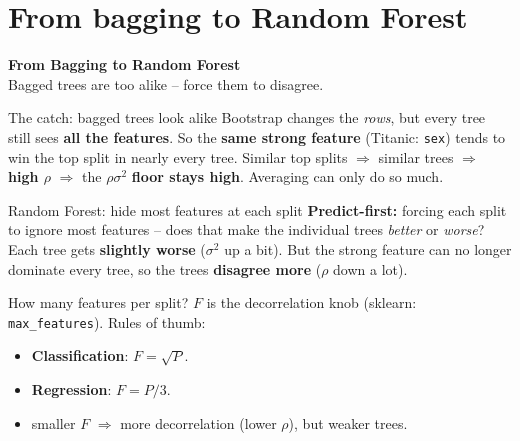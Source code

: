 \documentclass[aspectratio=169]{beamer}
\newcommand{\sectiontransition}[2]{%
  \begin{frame}[plain]
    \vfill
    \begin{center}
      {\Large\color{popblue}\textbf{#1}}\\[10pt]
      {\normalsize #2}
    \end{center}
    \vfill
  \end{frame}}
\begin{document}
\section{From bagging to Random Forest}
\sectiontransition{From Bagging to Random Forest}{Bagged trees are too alike -- force them to disagree.}

\begin{frame}{The catch: bagged trees look alike}
  Bootstrap changes the \emph{rows}, but every tree still sees \textbf{all the features}.
  So the \textbf{same strong feature} (Titanic: \texttt{sex}) tends to win the top split
  in nearly every tree.
  \vfill
  Similar top splits $\Rightarrow$ similar trees $\Rightarrow$ \textbf{high $\rho$}
  $\Rightarrow$ the $\rho\sigma^2$ \textbf{floor stays high}. Averaging can only do so much.
  \vfill
\end{frame}

\begin{frame}{Random Forest: hide most features at each split}
  \vfill
  \textbf{Predict-first:} forcing each split to ignore most features -- does that make the
  individual trees \emph{better} or \emph{worse}?
  \pause
  \vfill
  Each tree gets \textbf{slightly worse} ($\sigma^2$ up a bit). But the strong feature can
  no longer dominate every tree, so the trees \textbf{disagree more} ($\rho$ down a lot).
  \vfill
\end{frame}

\begin{frame}{How many features per split?}
  $F$ is the decorrelation knob (sklearn: \texttt{max\_features}). Rules of thumb:
  \begin{itemize}\small
    \item \textbf{Classification}: $F = \sqrt{P}$.
    \item \textbf{Regression}: $F = P/3$.
    \item smaller $F$ $\Rightarrow$ more decorrelation (lower $\rho$), but weaker trees.
  \end{itemize}
  \vfill
\end{frame}
\end{document}
